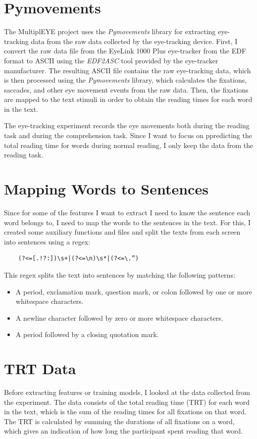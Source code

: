 \section{Pymovements}
The MultiplEYE project uses the \textit{Pymovements} library \cite{Krakowczyk2023_pymovements} for extracting eye-tracking data from the raw data collected by the eye-tracking device. First, I convert the raw data file from the EyeLink 1000 Plus eye-tracker from the EDF format to ASCII using the \textit{EDF2ASC} tool provided by the eye-tracker manufacturer. The resulting ASCII file contains the raw eye-tracking data, which is then processed using the \textit{Pymovements} library, which calculates the fixations, saccades, and other eye movement events from the raw data. Then, the fixations are mapped to the text stimuli in order to obtain the reading times for each word in the text.

The eye-tracking experiment records the eye movements both during the reading task and during the comprehension task. Since I want to focus on ppredicting the total reading time for words during normal reading, I only keep the data from the reading task.

\section{Mapping Words to Sentences}
Since for some of the features I want to extract I need to know the sentence each word belongs to, I need to map the words to the sentences in the text. For this, I created some auxiliary functions and files and split the texts from each screen into sentences using a regex: 
\begin{verbatim}
    (?<=[.!?:])\s+|(?<=\n)\s*|(?<=\.”)
\end{verbatim}
This regex splits the text into sentences by matching the following patterns:
\begin{itemize}
    \item A period, exclamation mark, question mark, or colon followed by one or more whitespace characters.
    \item A newline character followed by zero or more whitespace characters.
    \item A period followed by a closing quotation mark.
\end{itemize}

\section{TRT Data}
Before extracting features or training models, I looked at the data collected from the experiment. The data consists of the total reading time (TRT) for each word in the text, which is the sum of the reading times for all fixations on that word. The TRT is calculated by summing the durations of all fixations on a word, which gives an indication of how long the participant spent reading that word.


